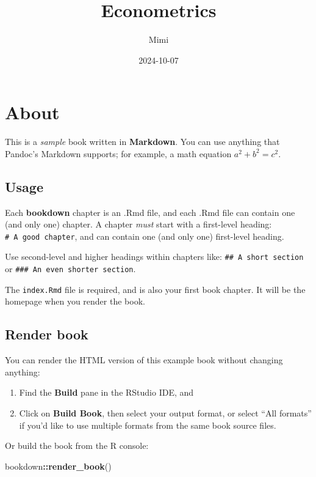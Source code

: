 \documentclass[
]{book}
\title{Econometrics}
\author{Mimi}
\date{2024-10-07}
\newenvironment{Shaded}{\begin{snugshade}}{\end{snugshade}}
\newcommand{\FunctionTok}[1]{\textcolor[rgb]{0.13,0.29,0.53}{\textbf{#1}}}
\newcommand{\NormalTok}[1]{#1}
\newcommand{\SpecialCharTok}[1]{\textcolor[rgb]{0.81,0.36,0.00}{\textbf{#1}}}
\theoremstyle{definition}
\theoremstyle{definition}
\theoremstyle{definition}
\theoremstyle{definition}
\theoremstyle{remark}
\begin{document}
\maketitle

{
\setcounter{tocdepth}{1}
\tableofcontents
}
\chapter*{About}\label{about}

This is a \emph{sample} book written in \textbf{Markdown}. You can use anything that Pandoc's Markdown supports; for example, a math equation \(a^2 + b^2 = c^2\).

\section{Usage}\label{usage}

Each \textbf{bookdown} chapter is an .Rmd file, and each .Rmd file can contain one (and only one) chapter. A chapter \emph{must} start with a first-level heading: \texttt{\#\ A\ good\ chapter}, and can contain one (and only one) first-level heading.

Use second-level and higher headings within chapters like: \texttt{\#\#\ A\ short\ section} or \texttt{\#\#\#\ An\ even\ shorter\ section}.

The \texttt{index.Rmd} file is required, and is also your first book chapter. It will be the homepage when you render the book.

\section{Render book}\label{render-book}

You can render the HTML version of this example book without changing anything:

\begin{enumerate}
\def\labelenumi{\arabic{enumi}.}
\item
  Find the \textbf{Build} pane in the RStudio IDE, and
\item
  Click on \textbf{Build Book}, then select your output format, or select ``All formats'' if you'd like to use multiple formats from the same book source files.
\end{enumerate}

Or build the book from the R console:

\begin{Shaded}
\begin{Highlighting}[]
\NormalTok{bookdown}\SpecialCharTok{::}\FunctionTok{render\_book}\NormalTok{()}
\end{Highlighting}
\end{Shaded}
\end{document}
